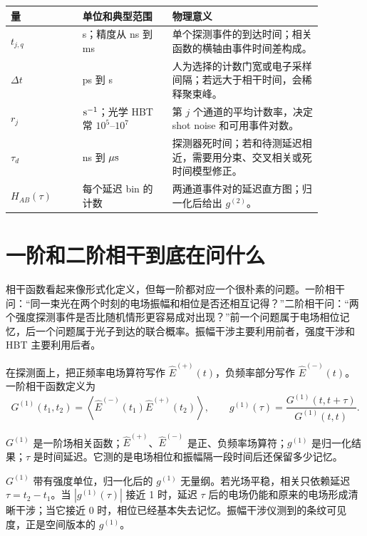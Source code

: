 \begin{longtable}{p{0.20\linewidth}p{0.25\linewidth}p{0.42\linewidth}}
\toprule
量 & 单位和典型范围 & 物理意义 \\
\midrule
\(t_{j,q}\) & s；精度从 ns 到 ms & 单个探测事件的到达时间；相关函数的横轴由事件时间差构成。 \\
\(\Delta t\) & ps 到 s & 人为选择的计数门宽或电子采样间隔；若远大于相干时间，会稀释聚束峰。 \\
\(r_j\) & \({\rm s^{-1}}\)；光学 HBT 常 \(10^5\)--\(10^7\) & 第 \(j\) 个通道的平均计数率，决定 shot noise 和可用事件对数。 \\
\(\tau_d\) & ns 到 \(\mu{\rm s}\) & 探测器死时间；若和待测延迟相近，需要用分束、交叉相关或死时间模型修正。 \\
\(H_{AB}(\tau)\) & 每个延迟 bin 的计数 & 两通道事件对的延迟直方图；归一化后给出 \(g^{(2)}\)。 \\
\bottomrule
\end{longtable}

\section{一阶和二阶相干到底在问什么}

相干函数看起来像形式化定义，但每一阶都对应一个很朴素的问题。一阶相干问：“同一束光在两个时刻的电场振幅和相位是否还相互记得？”二阶相干问：“两个强度探测事件是否比随机情形更容易成对出现？”前一个问题属于电场相位记忆，后一个问题属于光子到达的联合概率。振幅干涉主要利用前者，强度干涉和 HBT 主要利用后者。

在探测面上，把正频率电场算符写作 \(\hat E^{(+)}(t)\)，负频率部分写作 \(\hat E^{(-)}(t)\)。一阶相干函数定义为
\begin{equation}
  G^{(1)}(t_1,t_2)
  =
  \left\langle
    \hat E^{(-)}(t_1)\hat E^{(+)}(t_2)
  \right\rangle,
  \qquad
  g^{(1)}(\tau)=\frac{G^{(1)}(t,t+\tau)}{G^{(1)}(t,t)} .
  \label{eq:ch04-g1}
\end{equation}
\begin{formulaexplain}
\(G^{(1)}\) 是一阶场相关函数；\(\hat E^{(+)}\)、\(\hat E^{(-)}\) 是正、负频率场算符；\(g^{(1)}\) 是归一化结果；\(\tau\) 是时间延迟。它测的是电场相位和振幅隔一段时间后还保留多少记忆。
\end{formulaexplain}
\(G^{(1)}\) 带有强度单位，归一化后的 \(g^{(1)}\) 无量纲。若光场平稳，相关只依赖延迟 \(\tau=t_2-t_1\)。当 \(|g^{(1)}(\tau)|\) 接近 1 时，延迟 \(\tau\) 后的电场仍能和原来的电场形成清晰干涉；当它接近 0 时，相位已经基本失去记忆。振幅干涉仪测到的条纹可见度，正是空间版本的 \(g^{(1)}\)。


